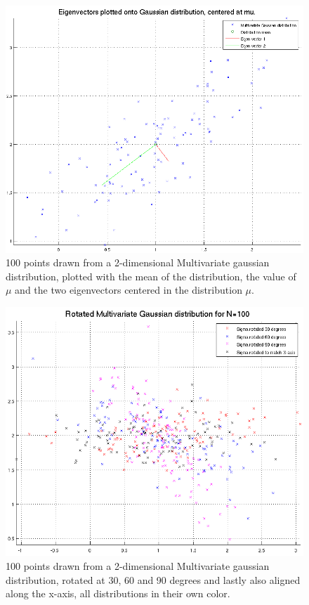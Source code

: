 \begin{figure}[h!]
	\includegraphics[width=\textwidth]{img/multigausseigen}
	\caption{100 points drawn from a 2-dimensional Multivariate gaussian
          distribution, plotted with the mean of the distribution, the value of
          $\mu$ and the two eigenvectors centered in the distribution
          $\mu$. \label{fig:I.2.4.1}}
\end{figure}

\begin{figure}[h!]
	\includegraphics[width=\textwidth]{img/multigaussrotate}
	\caption{100 points drawn from a 2-dimensional Multivariate gaussian
          distribution, rotated at 30, 60 and 90 degrees and lastly also aligned
          along the x-axis, all distributions in their own
          color. \label{fig:I.2.4.1.rot}}
\end{figure}

